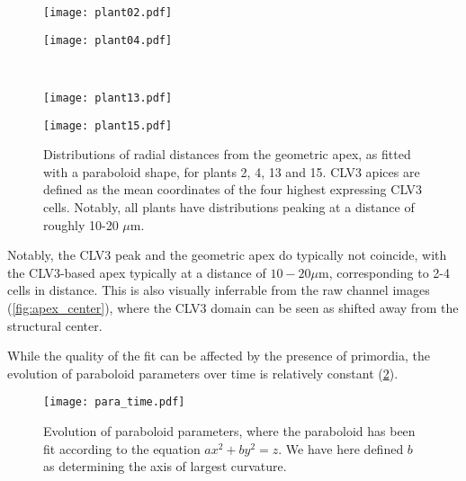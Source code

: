 \begin{figure}[H]
  \centering
  \begin{minipage}{.8\textwidth}
		\begin{minipage}[t]{0.49\textwidth}
      \centering
			\texttt{[image: plant02.pdf]} 
    \end{minipage}\hfill
		\begin{minipage}[t]{.49\textwidth}
      \centering
			\texttt{[image: plant04.pdf]} 
    \end{minipage}
  \end{minipage}\\
  \begin{minipage}{.8\textwidth}
		\begin{minipage}[t]{0.49\textwidth}
      \centering
			\texttt{[image: plant13.pdf]} 
    \end{minipage}\hfill
		\begin{minipage}[t]{.49\textwidth}
      \centering
			\texttt{[image: plant15.pdf]} 
    \end{minipage}
  \end{minipage}
	\caption[Comparison between geometric and genetic apex]{Distributions of
    radial distances from the geometric apex, as fitted with a paraboloid shape,
    for plants 2, 4, 13 and 15.
    CLV3 apices are defined as the mean coordinates of the four highest
    expressing CLV3 cells. Notably, all plants have distributions peaking at
    a distance of roughly 10-20 $\mu$m.
  }
  \label{fig:age_clusters}
\end{figure}
Notably, the CLV3 peak and the geometric apex do typically not coincide, with
the CLV3-based apex typically at a distance of $10-20\mu$m, corresponding to 2-4
cells in distance. This is also visually inferrable from the raw channel images
(\cref{fig:apex_center}), where the CLV3 domain can be seen as shifted away from
the structural center.

While the quality of the fit can be affected by the presence
of primordia, the evolution of paraboloid parameters over time is relatively
constant (\cref{fig:para_time}).

\begin{figure}[H]
  \centering
  \texttt{[image: para\_time.pdf]}
  \caption[Paraboloid time evolution]{Evolution of paraboloid parameters, where
    the paraboloid has been fit according to the equation $ax^2 + by^2 = z$. We
    have here defined $b$ as determining the axis of largest curvature.}
  \label{fig:para_time}
\end{figure}

